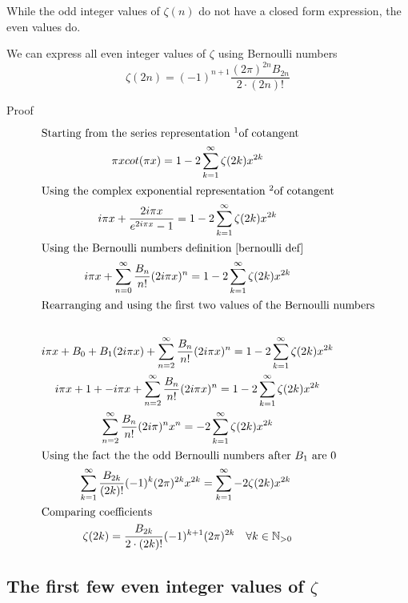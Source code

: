 \documentclass[a4paper]{article}
\begin{document}
While the odd integer values of $\zeta(n)$ do not have a closed form expression, the even values do.

\begin{theorem}
We can express all even integer values of $\zeta$ using Bernoulli numbers
\begin{equation} \label{even zeta} 
\zeta(2n) = (-1)^{n+1} \frac{(2\pi)^{2n} B_{2n}}{2 \cdot (2n)!}
\end{equation}

Proof
\begin{gather*}
\intertext{Starting from the series representation \footnotemark of cotangent}
\pi x cot(\pi x) = 1 - 2 \sum_{k=1}^{\infty} \zeta(2k) x^{2k}
\\
\intertext{Using the complex exponential representation \footnotemark of cotangent}
i \pi x +  \frac{2i \pi x}{e^{2 i\pi x} -1} = 1 - 2 \sum_{k=1}^{\infty} \zeta(2k) x^{2k}
\\
\intertext{Using the Bernoulli numbers definition \ref{bernoulli def}} 
i \pi x + \sum_{n=0}^{\infty} \frac{B_n}{n!} (2 i\pi x)^n
 = 1 - 2 \sum_{k=1}^{\infty} \zeta(2k) x^{2k}
\\
\intertext{Rearranging and using the first two values of the Bernoulli numbers} 
\\
i \pi x + B_0 + B_1 (2 i \pi x) +  \sum_{n=2}^{\infty} \frac{B_n}{n!} (2 i\pi x)^n
 = 1 - 2 \sum_{k=1}^{\infty} \zeta(2k) x^{2k}
\\
i \pi x + 1 + - i \pi x +  \sum_{n=2}^{\infty} \frac{B_n}{n!} (2 i\pi x)^n
 = 1 - 2 \sum_{k=1}^{\infty} \zeta(2k) x^{2k}
\\
\sum_{n=2}^{\infty} \frac{B_n}{n!} (2 i\pi)^n x^n
 = - 2 \sum_{k=1}^{\infty} \zeta(2k) x^{2k}
\\
\intertext{Using the fact the the odd Bernoulli numbers after $B_1$ are 0} 
\sum_{k=1}^{\infty} \frac{B_{2k}}{(2k)!} (-1)^{k}(2 \pi)^{2k} x^{2k}
 = \sum_{k=1}^{\infty} - 2 \zeta(2k) x^{2k}\
\\
\intertext{Comparing coefficients}
\zeta(2k) =  \frac{B_{2k}}{2 \cdot (2k)!} (-1)^{k+1}(2 \pi)^{2k} \quad \forall  k \in \mathbb N_{> 0}
\end{gather*}
\end{theorem}

\addtocounter{footnote}{-1}

\subsection{The first few even integer values of $\zeta$}
\end{document}

